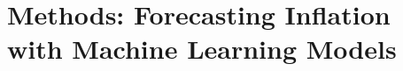 \pagebreak
\section{Methods: Forecasting Inflation with Machine Learning Models} \label{sec:methods}
